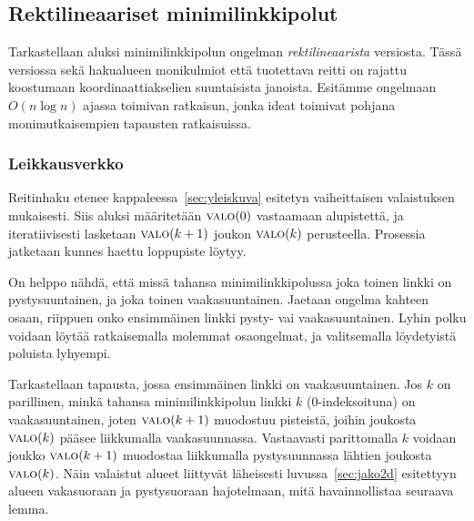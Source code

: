 \documentclass[finnish]{tktltiki2}
\theoremstyle{definition}
\theoremstyle{remark}
\newcommand\reach[1]{\ensuremath{\textsc{valo}(#1)}\xspace}
\begin{document}
\subsection{Rektilineaariset minimilinkkipolut}\label{subsec:rect2d}

Tarkastellaan aluksi minimilinkkipolun ongelman \emph{rektilineaarista} versiosta.
Tässä versiossa sekä hakualueen monikulmiot että tuotettava reitti on rajattu koostumaan koordinaattiakselien suuntaisista janoista.
Esitämme ongelmaan $O(n \log n)$ ajassa toimivan ratkaisun, jonka ideat toimivat pohjana monimutkaisempien tapausten ratkaisuissa.

\subsubsection{Leikkausverkko}

Reitinhaku etenee kappaleessa~\ref{sec:yleiskuva} esitetyn vaiheittaisen valaistuksen mukaisesti.
Siis aluksi määritetään \reach{0} vastaamaan alupistettä, ja iteratiivisesti lasketaan \reach{k+1} joukon \reach{k} perusteella.
Prosessia jatketaan kunnes haettu loppupiste löytyy.

On helppo nähdä, että missä tahansa minimilinkkipolussa joka toinen linkki on pystysuuntainen, ja joka toinen vaakasuuntainen.
Jaetaan ongelma kahteen osaan, riippuen onko ensimmäinen linkki pysty- vai vaakasuuntainen.
Lyhin polku voidaan löytää ratkaisemalla molemmat osaongelmat, ja valitsemalla löydetyistä poluista lyhyempi.

Tarkastellaan tapausta, jossa ensimmäinen linkki on vaakasuuntainen.
Jos $k$ on parillinen, minkä tahansa minimilinkkipolun linkki $k$ (0-indeksoituna) on vaakasuuntainen, joten \reach{k+1} muodostuu pisteistä, joihin joukosta \reach{k} pääsee liikkumalla vaakasuunnassa.
Vastaavasti parittomalla $k$ voidaan joukko \reach{k+1} muodostaa liikkumalla pystysuunnassa lähtien joukosta \reach{k}.
Näin valaistut alueet liittyvät läheisesti luvussa~\ref{sec:jako2d} esitettyyn alueen vakasuoraan ja pystysuoraan hajotelmaan, mitä havainnollistaa seuraava lemma.
\end{document}
